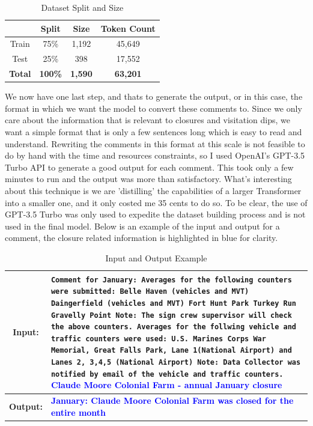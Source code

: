 \documentclass[12pt]{article}
\begin{document}
\begin{center}
\begin{table}[ht]
    \centering
    \begin{tabular}{|c|c|c|c|}
        \hline
         & Split & Size & Token Count \\
        \hline
        Train & 75\% & 1,192 & 45,649 \\
        \hline
        Test & 25\% & 398 & 17,552 \\
        \hline
        \textbf{Total} & \textbf{100\%} & \textbf{1,590} & \textbf{63,201} \\
        \hline
    \end{tabular}
    \caption{Dataset Split and Size}
\end{table}
\end{center}
We now have one last step, and thats to generate the output, or in this case, the format in which we want the model to convert these comments to. Since we only care about the information that is relevant to closures and visitation dips, we want a simple format that is only a few sentences long which is easy to read and understand. Rewriting the comments in this format at this scale is not feasible to do by hand with the time and resources constraints, so I used OpenAI's GPT-3.5 Turbo API to generate a good output for each comment. This took only a few minutes to run and the output was more than satisfactory. What's interesting about this technique is we are 'distilling' the capabilities of a larger Transformer into a smaller one, and it only costed me 35 cents to do so. To be clear, the use of GPT-3.5 Turbo was only used to expedite the dataset building process and is not used in the final model. Below is an example of the input and output for a comment, the closure related information is highlighted in blue for clarity.
\\

\begin{table}[ht]
    \centering
    \begin{tabular}{|c|p{}|}
        \hline
        \textbf{Input:} & \texttt{Comment for January: Averages for the following counters were submitted: Belle Haven (vehicles and MVT) Daingerfield (vehicles and MVT) Fort Hunt Park Turkey Run Gravelly Point  Note: The sign crew supervisor will check the above counters. Averages for the follwing vehicle and traffic counters were used: U.S. Marines Corps War Memorial, Great Falls Park, Lane 1(National Airport) and Lanes 2, 3,4,5 (National Airport) Note: Data Collector was notified by email of the vehicle and traffic counters.} \textbf{\textcolor{blue}{Claude Moore Colonial Farm - annual January closure}} \\
        \hline
        \textbf{Output:} & \textbf{\textcolor{blue}{January: Claude Moore Colonial Farm was closed for the entire month}} \\
        \hline
    \end{tabular}
    \caption{Input and Output Example}
\end{table}
\end{document}
